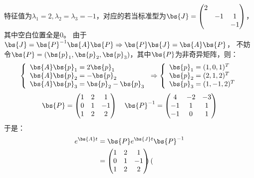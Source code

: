 \documentclass[12pt, a4paper, oneside, UTF8]{ctexbook}
\begin{document}
\begin{solution}
    特征值为$\lambda_1=2,\lambda_2=\lambda_3=-1$，对应的若当标准型为$\bs{J}=\begin{pmatrix}
        2 & & \\
        & -1& 1\\
        & & -1
    \end{pmatrix}$，其中空白位置全是$0$。
    由于$\bs{J}=\bs{P}^{-1}\bs{A}\bs{P} \Rightarrow \bs{P}\bs{J}=\bs{A}\bs{P}$，
    不妨令$\bs{P}=(\bs{p}_1,\bs{p}_2,\bs{p}_3)$，其中$\bs{P}$为非奇异矩阵，则：
    \begin{align*}
        \left\{
            \begin{array}{ll}
                \bs{A}\bs{p}_1=2\bs{p}_1 \\
                \bs{A}\bs{p}_2=-\bs{p}_2 \\
                \bs{A}\bs{p}_3=\bs{p}_2-\bs{p}_3
            \end{array} 
            \right.
            \Rightarrow
            \left\{
            \begin{array}{ll}
                \bs{p}_1=(1,0,1)^T \\
                \bs{p}_2=(2,1,2)^T \\
                \bs{p}_3=(1,-1,2)^T
            \end{array} 
            \right.
    \end{align*}
    \begin{align*}
        \bs{P}=\begin{pmatrix}
            1 & 2 &1 \\
            0 & 1 &-1 \\
            1 & 2 &2
        \end{pmatrix} \quad
        \bs{P}^{-1}=\begin{pmatrix}
            4&-2&-3\\
            -1&1&1\\
            -1&0&1       
        \end{pmatrix}
    \end{align*}
    于是：
    \begin{align*}
        e^{\bs{A}t}&=\bs{P}e^{\bs{J}t}\bs{P}^{-1} \\
        &=\begin{pmatrix}
            1 & 2 &1 \\
            0 & 1 &-1 \\
            1 & 2 &2
        \end{pmatrix} \begin{pmatrix}

\end{pmatrix}
\end{align*}
\end{solution}
\end{document}
